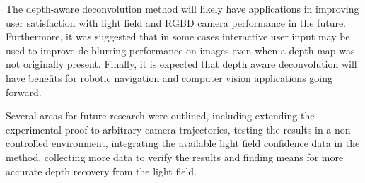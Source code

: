 The depth-aware deconvolution method will likely have applications in improving user satisfaction with light field and RGBD camera performance in the future.
Furthermore, it was suggested that in some cases interactive user input may be used to improve de-blurring performance on images even when a depth map was not originally present.
Finally, it is expected that depth aware deconvolution will have benefits for robotic navigation and computer vision applications going forward.

Several areas for future research were outlined, including extending the experimental proof to arbitrary camera trajectories, testing the results in a non-controlled environment, integrating the available light field confidence data in the method, collecting more data to verify the results and finding means for more accurate depth recovery from the light field.
